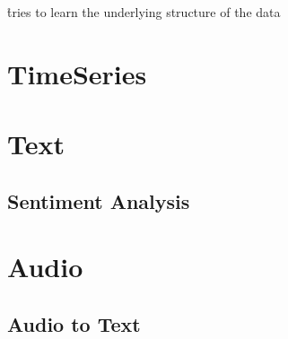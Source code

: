 \r{tries to learn the underlying structure of the data}



\section{TimeSeries}

\section{Text}

\subsection{Sentiment Analysis}

\section{Audio}

\subsection{Audio to Text}

